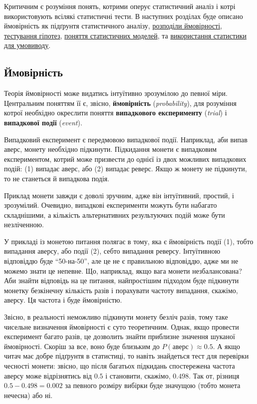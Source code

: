 \documentclass[
  11pt,
]{book}
\begin{document}
Критичним є розуміння понять, котрими оперує статистичний аналіз і котрі використовують всілякі статистичні тести. В наступних розділах буде описано ймовірність як підґрунтя статистичного аналізу, \hyperref[pdf-pmf]{розподіли ймовірності}, \hyperref[basic-hypotheses]{тестування гіпотез}, \hyperref[stat-models]{поняття статистичних моделей}, та \hyperref[infer]{використання статистики для умовиводу}.

\subsection{Ймовірність}\label{prob}

Теорія ймовірності може видатись інтуїтивно зрозумілою до певної міри. Центральним поняттям її є, звісно, \textbf{ймовірність} (\emph{probability}), для розуміння котрої необхідно окреслити поняття \textbf{випадкового експерименту} (\emph{trial}) і \textbf{випадкової події} (\emph{event}).

Випадковий експеримент є передмовою випадкової події. Наприклад, аби випав аверс, монету необхідно підкинути. Підкидання монети є випадковим експериментом, котрий може призвести до однієї із двох можливих випадкових подій: (1) випадає аверс, або (2) випадає реверс. Якщо ж монету не підкинути, то не станеться й випадкова подія.

Приклад монети завжди є доволі зручним, адже він інтуїтивний, простий, і зрозумілий. Очевидно, випадкові експерименти можуть бути набагато складнішими, а кількість альтернативних результуючих подій може бути незліченною.

У прикладі із монетою питання полягає в тому, яка є ймовірність події (1), тобто випадання аверсу, або події (2), себто випадання реверсу. Інтуїтивною відповіддю буде ``50-на-50'', але це не є правильною відповіддю, адже ми не можемо знати це непевне. Що, наприклад, якщо вага монети незбалансована? Аби знайти відповідь на це питання, найпростішим підходом буде підкинути монетку безкінечну кількість разів і порахувати частоту випадання, скажімо, аверсу. Ця частота і буде ймовірністю.

Звісно, в реальності неможливо підкинути монету безліч разів, тому таке чисельне визначення ймовірності є суто теоретичним. Однак, якщо провести експеримент багато разів, це дозволить знайти приблизне значення шуканої ймовірності. Скоріш за все, воно буде близьким до \(P(аверс) \approx 0.5\). А якщо читач має добре підґрунтя в статистиці, то навіть знайдеться тест для перевірки чесності монети: звісно, що після багатьох підкидань спостережена частота аверсу може відрізнятись від \(0.5\) і становити, скажімо, \(0.498\). Так от, різниця \(0.5 - 0.498 = 0.002\) за певного розміру вибірки буде значущою (тобто монета нечесна) або ні.
\end{document}
